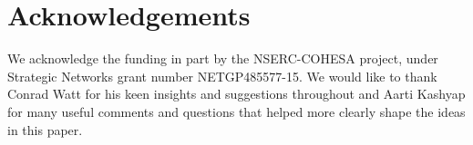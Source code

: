 
\section*{Acknowledgements}
We acknowledge the funding in part by the NSERC-COHESA project, under Strategic Networks grant number NETGP485577-15.
We would like to thank Conrad Watt for his keen insights and suggestions throughout 
and Aarti Kashyap for many useful comments and questions that helped more clearly shape the ideas in this paper. 